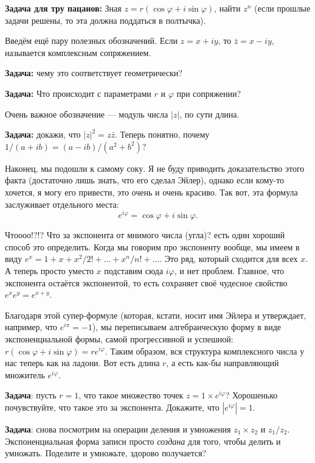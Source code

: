 \documentclass[12pt]{article}
\begin{document}
{\bf Задача для тру пацанов:} Зная $z = r \left( \cos \varphi + i \sin \varphi \right)$, найти $z^n$ (если прошлые задачи решены, то эта должна поддаться в полтычка).

Введём ещё пару полезных обозначений. Если $z = x + i y$, то $\bar{z} = x - i y$, называется комплексным сопряжением.

{\bf Задача:} чему это соответствует геометрически?

{\bf Задача:} Что происходит с параметрами $r$ и $\varphi$ при сопряжении?

Очень важное обозначение --- модуль числа $|z|$, по сути длина. 

{\bf Задача:} докажи, что $|z|^2 = z \bar{z}$. Теперь понятно, почему $1 / (a + i b) = (a - i b) / (a^2 + b^2)$?

Наконец, мы подошли к самому соку. Я не буду приводить доказательство этого факта (достаточно лишь знать, что его сделал Эйлер), однако если кому-то хочется, я могу его привести, это очень и очень красиво. Так вот, эта формула заслуживает отдельного места: $$\boxed{e^{i \varphi} = \cos \varphi + i \sin \varphi}.$$

Чтоооо!?!? Что за экспонента от мнимого числа (угла)? есть один хороший способ это определить. Когда мы говорим про экспоненту вообще, мы имеем в виду $e^x = 1 + x + x^2 / 2! + \ldots + x^n / n! + \ldots$. Это ряд, который сходится для всех $x$. А теперь просто уместо $x$ подставим сюда $i \varphi$, и нет проблем. Главное, что экспонента остаётся экспонентой, то есть сохраняет своё чудесное свойство $e^x e^y = e^{x + y}$.

Благодаря этой супер-формуле (которая, кстати, носит имя Эйлера и утверждает, например, что $e^{i \pi} = -1$), мы переписываем алгебраическую форму в виде экспоненциальной формы, самой прогрессивной и успешной: $r \left( \cos \varphi + i \sin \varphi \right) = r e^{i \varphi}$. Таким образом, вся структура комплексного числа у нас теперь как на ладони. Вот есть длина $r$, а есть как-бы направляющий множитель $e^{i \varphi}$.

{\bf Задача}: пусть $r = 1$, что такое множество точек $z = 1 \times e^{i \varphi}$? Хорошенько почувствуйте, что такое это за экспонента. Докажите, что $|e^{i \varphi}| = 1$.

{\bf Задача}: снова посмотрим на операции деления и умножения $z_1 \times z_2$ и $z_1 / z_2$. Экспоненциальная форма записи просто {\it создана} для того, чтобы делить и умножать. Поделите и умножьте, здорово получается?
\end{document}
